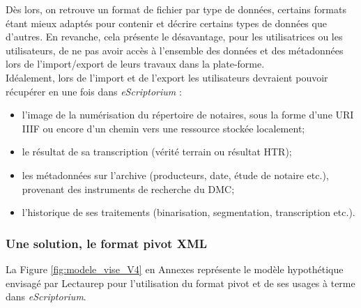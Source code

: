 Dès lors, on retrouve un format de fichier par type de données, certains formats étant mieux adaptés pour contenir et décrire certains types de données que d'autres. En revanche, cela présente le désavantage, pour les utilisatrices ou les utilisateurs, de ne pas avoir accès à l'ensemble des données et des métadonnées lors de l'import/export de leurs travaux dans la plate-forme.\\

Idéalement, lors de l'import et de l'export les utilisateurs devraient pouvoir récupérer en une fois dans \textit{eScriptorium} :
\begin{itemize}
    \item l'image de la numérisation du répertoire de notaires, sous la forme d'une URI IIIF ou encore d'un chemin vers une ressource stockée localement;
    \item le résultat de sa transcription (vérité terrain ou résultat HTR);
    \item les métadonnées sur l'archive (producteurs, date, étude de notaire etc.), provenant des instruments de recherche du DMC;
    \item l'historique de ses traitements (binarisation, segmentation, transcription etc.).
\end{itemize}
\newpage
\subsubsection{Une solution, le format pivot XML}
La Figure \ref{fig:modele_vise_V4} en Annexes représente le modèle hypothétique envisagé par Lectaurep pour l'utilisation du format pivot et de ses usages à terme dans \textit{eScriptorium}. \\

